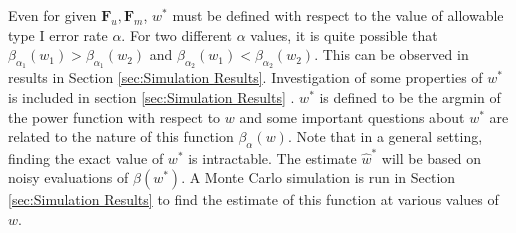 \documentclass[11pt]{article} %
\begin{document}
Even for  given $\mathbf{F}_u,\mathbf{F}_m$,   $w^*$ must be defined with respect to the value of allowable type I error rate $\alpha$.  For two different $\alpha$ values, it is quite possible that $\beta_{\alpha_1}(w_1)>\beta_{\alpha_1}(w_2)$  and $\beta_{\alpha_2}(w_1)<\beta_{\alpha_2}(w_2)$. This can be observed in results in Section \ref{sec:Simulation Results}.  
Investigation of some  properties of $w^{*}$  is included in section  \ref{sec:Simulation Results} .
 $w^*$ is defined to be the argmin of  the power function with respect to $w$ and some important questions about $w^*$ are  related to the nature of this function $\beta_{\alpha}\left( w\right)$.
Note that in a general setting, finding the exact value of $w^*$ is intractable. The estimate $\hat{w}^*$ will be based on noisy evaluations of $\beta(w^*)$.  A Monte Carlo simulation is run in  Section  \ref{sec:Simulation Results} 
to find the estimate of this function at various values of $w$.
\end{document}
